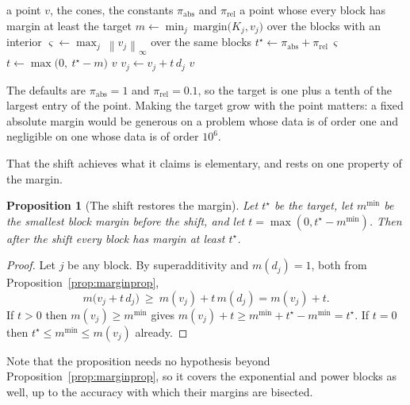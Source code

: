 \documentclass[a4paper,11pt]{book}
\theoremstyle{plain}
\newtheorem{proposition}[theorem]{Proposition}
\theoremstyle{definition}
\theoremstyle{remark}
\numberwithin{equation}{chapter}
\numberwithin{algorithm}{chapter}
\newcommand{\norm}[1]{\left\|#1\right\|}
\begin{document}
	\begin{algorithm}[H]
		\caption{\texttt{shift\_inside}, on one side}
		\begin{algorithmic}[1]
			\Require a point $v$, the cones, the constants
			$\pi_{\mathrm{abs}}$ and $\pi_{\mathrm{rel}}$
			\Ensure a point whose every block has margin at least the target
			\State $m\gets\min_j\ \text{margin}\bigl(K_j,v_j\bigr)$
			over the blocks with an interior
			\State $\varsigma\gets\max_j\ \norm{v_j}_\infty$
			over the same blocks
			\State $t^{\star}\gets\pi_{\mathrm{abs}}+\pi_{\mathrm{rel}}\,\varsigma$
			\State $t\gets\max\bigl(0,\ t^{\star}-m\bigr)$
			\State \Return $v$
			\EndIf
			\State $v_j\gets v_j+t\,d_j$
			\EndFor
			\State \Return $v$
		\end{algorithmic}
	\end{algorithm}

	The defaults are $\pi_{\mathrm{abs}}=1$ and $\pi_{\mathrm{rel}}=0.1$, so the
	target is one plus a tenth of the largest entry of the point. Making the
	target grow with the point matters: a fixed absolute margin would be
	generous on a problem whose data is of order one and negligible on one whose
	data is of order $10^6$.

	That the shift achieves what it claims is elementary, and rests on one
	property of the margin.

	\begin{proposition}[The shift restores the margin]\label{prop:shift}
		Let $t^{\star}$ be the target, let $m^{\min}$ be the smallest block margin
		before the shift, and let $t=\max(0,t^{\star}-m^{\min})$. Then after the
		shift every block has margin at least $t^{\star}$.
	\end{proposition}

	\begin{proof}
		Let $j$ be any block. By superadditivity and $m(d_j)=1$, both from
		Proposition~\ref{prop:marginprop},
		\[
		m\bigl(v_j+t\,d_j\bigr)\ \geq\ m(v_j)+t\,m(d_j)=m(v_j)+t .
		\]
		If $t>0$ then $m(v_j)\geq m^{\min}$ gives
		$m(v_j)+t\geq m^{\min}+t^{\star}-m^{\min}=t^{\star}$. If $t=0$ then
		$t^{\star}\leq m^{\min}\leq m(v_j)$ already.
	\end{proof}

	Note that the proposition needs no hypothesis beyond
	Proposition~\ref{prop:marginprop}, so it covers the exponential and power
	blocks as well, up to the accuracy with which their margins are bisected.
\end{document}
